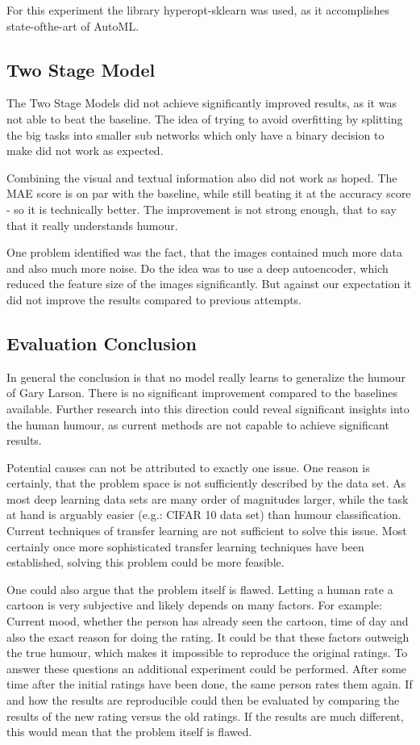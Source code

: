 \documentclass[draft,final,oneside]{vutinfth} %
\begin{document}
For this experiment the library hyperopt-sklearn was used, as it accomplishes state-ofthe-art of AutoML.

\subsection{Two Stage Model}
The Two Stage Models did not achieve significantly improved results, as it was not able
to beat the baseline. The idea of trying to avoid overfitting by splitting the big tasks into
smaller sub networks which only have a binary decision to make did not work as expected.

Combining the visual and textual information also did not work as hoped. The MAE
score is on par with the baseline, while still beating it at the accuracy score - so it is
technically better. The improvement is not strong enough, that to say that it really
understands humour.

One problem identified was the fact, that the images contained much more data and
also much more noise. Do the idea was to use a deep autoencoder, which reduced the
feature size of the images significantly. But against our expectation it did not improve
the results compared to previous attempts.

\subsection{Evaluation Conclusion}

In general the conclusion is that no model really learns to generalize the humour of
Gary Larson. There is no significant improvement compared to the baselines available.
Further research into this direction could reveal significant insights into the human humour, as current methods are not capable to achieve significant results.

Potential causes can not be attributed to exactly one issue. One reason is certainly, that the problem space is not sufficiently described by the data set. As most deep learning data sets are many order of magnitudes larger, while the task at hand is arguably easier (e.g.: CIFAR 10 data set) than humour classification. Current techniques of transfer learning are not sufficient to solve this issue. Most certainly once more sophisticated transfer learning techniques have been established, solving this problem could be more feasible. 

One could also argue that the problem itself is flawed. Letting a human rate a
cartoon is very subjective and likely depends on many factors. For example: Current mood, whether the person has already seen the cartoon, time of day and also the exact reason for doing the rating. It could be that these factors outweigh the true humour, which makes it impossible to reproduce the original ratings. To answer these questions an additional experiment could be performed. After some time after the initial ratings have been done, the same person rates them again. If and how the results are reproducible could then be evaluated by comparing the results of the new rating versus the old ratings. If the results are much different, this would mean that the problem itself is flawed.
\end{document}
